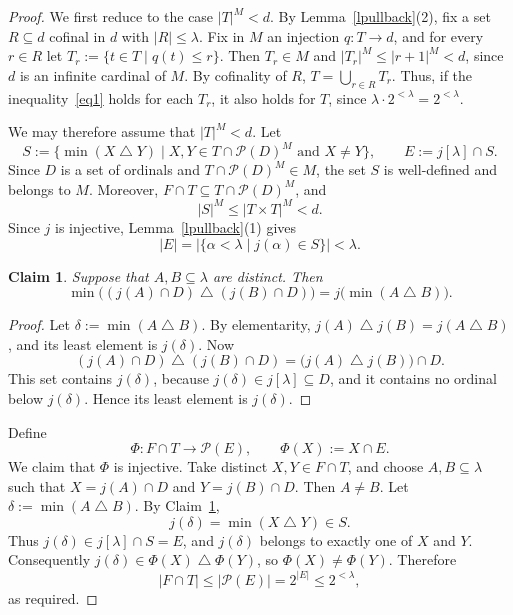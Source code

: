 \documentclass[10pt,a4paper]{amsart}
\newtheorem{claim}{Claim}[thm]
\theoremstyle{definition}
\theoremstyle{remark}
\newcommand\symdiff{\mathbin{\bigtriangleup}}
\renewcommand{\mid}{\mathrel{|}\allowbreak}
\newcommand\s{\subseteq}
\begin{document}
\begin{proof}
    We first reduce to the case $|T|^M<d$.
    By Lemma~\ref{lpullback}(2), fix a set $R\subseteq d$ cofinal in $d$ with $|R|\le\lambda$.
    Fix in $M$ an injection $q:T\rightarrow d$, and for every $r\in R$ let $T_r:=\{t\in T\mid q(t)\le r\}$.
    Then $T_r\in M$ and $|T_r|^M\le|r+1|^M<d$, since $d$ is an infinite cardinal of $M$.
    By cofinality of $R$, $T=\bigcup_{r\in R}T_r$.
    Thus, if the inequality~\eqref{eq1} holds for each $T_r$, it also holds for $T$, since $\lambda\cdot 2^{<\lambda}=2^{<\lambda}$.

    We may therefore assume that $|T|^M<d$.
    Let
    $$S:=\{\min(X\symdiff Y)\mid X,Y\in T\cap\mathcal P(D)^M\text{ and }X\neq Y\}, \qquad E:=j[\lambda]\cap S.$$
    Since $D$ is a set of ordinals and $T\cap\mathcal P(D)^M\in M$, the set $S$ is well-defined and belongs to $M$.
    Moreover, $F\cap T\subseteq T\cap\mathcal P(D)^M$, and
    $$|S|^M\le|T\times T|^M<d.$$
    Since $j$ is injective, Lemma~\ref{lpullback}(1) gives
    $$|E|=|\{\alpha<\lambda\mid j(\alpha)\in S\}|<\lambda.$$

    \begin{claim}\label{cldelta}
        Suppose that $A,B\s\lambda$ are distinct. Then
        $$\min\bigl((j(A)\cap D)\symdiff(j(B)\cap D)\bigr)=j\bigl(\min(A\symdiff B)\bigr).$$
    \end{claim}
    \begin{proof}
        Let $\delta:=\min(A\symdiff B)$.
        By elementarity, $j(A)\symdiff j(B)=j(A\symdiff B)$, and its least element is $j(\delta)$.
        Now
        $$(j(A)\cap D)\symdiff(j(B)\cap D)=\bigl(j(A)\symdiff j(B)\bigr)\cap D.$$
        This set contains $j(\delta)$, because $j(\delta)\in j[\lambda]\s D$,
        and it contains no ordinal below $j(\delta)$.
        Hence its least element is $j(\delta)$.
    \end{proof}

    Define
    $$\Phi:F\cap T\longrightarrow\mathcal P(E),\qquad
        \Phi(X):=X\cap E.$$
    We claim that $\Phi$ is injective.
    Take distinct $X,Y\in F\cap T$, and choose $A,B\subseteq\lambda$ such that
    $X=j(A)\cap D$ and $Y=j(B)\cap D$.
    Then $A\neq B$. Let $\delta:=\min(A\symdiff B)$.
    By Claim~\ref{cldelta},
    $$j(\delta)=\min(X\symdiff Y)\in S.$$
    Thus $j(\delta)\in j[\lambda]\cap S=E$, and $j(\delta)$ belongs to exactly one of $X$ and $Y$.
    Consequently $j(\delta)\in\Phi(X)\symdiff\Phi(Y)$, so $\Phi(X)\neq\Phi(Y)$.
    Therefore
    $$|F\cap T|\le|\mathcal P(E)|=2^{|E|}\le 2^{<\lambda},$$
    as required.
\end{proof}
\end{document}
